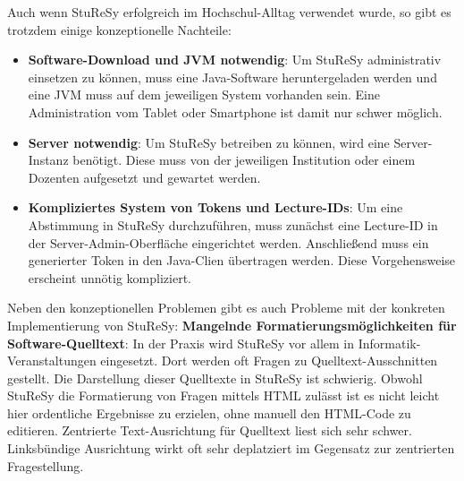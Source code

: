 Auch wenn StuReSy erfolgreich im Hochschul-Alltag verwendet wurde, so gibt es trotzdem einige konzeptionelle Nachteile:
\begin{itemize}
    \item \textbf{Software-Download und JVM notwendig}: Um StuReSy administrativ einsetzen zu können, muss eine Java-Software heruntergeladen werden und eine JVM muss auf dem jeweiligen System vorhanden sein. Eine Administration vom Tablet oder Smartphone ist damit nur schwer möglich.
    \item \textbf{Server notwendig}: Um StuReSy betreiben zu können, wird eine Server-Instanz benötigt. Diese muss von der jeweiligen Institution oder einem Dozenten aufgesetzt und gewartet werden.
    \item \textbf{Kompliziertes System von Tokens und Lecture-IDs}: Um eine Abstimmung in StuReSy durchzuführen, muss zunächst eine Lecture-ID in der Server-Admin-Oberfläche eingerichtet werden. Anschließend muss ein generierter Token in den Java-Clien übertragen werden. Diese Vorgehensweise erscheint unnötig kompliziert.
\end{itemize}

Neben den konzeptionellen Problemen gibt es auch Probleme mit der konkreten Implementierung von StuReSy:\newline
\textbf{Mangelnde Formatierungsmöglichkeiten für Software-Quelltext}: In der Praxis wird StuReSy vor allem in Informatik-Veranstaltungen eingesetzt. Dort werden oft Fragen zu Quelltext-Ausschnitten gestellt. Die Darstellung dieser Quelltexte in StuReSy ist schwierig. Obwohl StuReSy die Formatierung von Fragen mittels HTML zulässt ist es nicht leicht hier ordentliche Ergebnisse zu erzielen, ohne manuell den HTML-Code zu editieren. Zentrierte Text-Ausrichtung für Quelltext liest sich sehr schwer. Linksbündige Ausrichtung wirkt oft sehr deplatziert im Gegensatz zur zentrierten Fragestellung.
